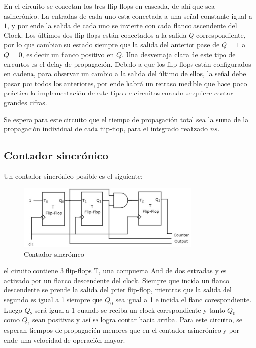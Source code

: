 En el circuito se conectan los tres flip-flops en cascada, de ahí que sea asincrónico. La entradas de cada uno esta conectada a una señal constante igual a $1$, y por ende la salida de cada uno se invierte con cada flanco ascendente del Clock. Los últimos dos flip-flops están conectados a la salida $\bar{Q}$ correspondiente, por lo que cambian su estado siempre que la salida del anterior pase de $Q = 1$ a $Q = 0$, es decir un flanco positivo en $\bar{Q}$. Una desventaja clara de este tipo de circuitos es el delay de propagación. Debido a que los flip-flops están configurados en cadena, para observar un cambio a la salida del último de ellos, la señal debe pasar por todos los anteriores, por ende habrá un retraso medible que hace poco práctica la implementación de este tipo de circuitos cuando se quiere contar grandes cifras. 


Se espera para este circuito que el tiempo de propagaci\'on total sea la suma de la propagaci\'on individual de cada flip-flop, para el integrado realizado $ns$.


\subsection{Contador sincrónico}

Un contador sincr\'onico posible es el siguiente:


\begin{figure}[H]
	\centering
	\includegraphics[width=0.8\textwidth]{Ejercicio7/Recursos/sincronico}
	\caption{Contador sincr\'onico}
\end{figure}

el ciruito contiene 3 flip-flops T, una compuerta And de dos entradas y es activado por un flanco descendente del clock. Siempre que incida un  flanco descendente se prende la salida del prier flip-flop, mientras que la salida del segundo es igual a 1 siempre que $Q_0$ sea igual a 1 e incida el flanc corespondiente. Luego $Q_2$ ser\'a igual a 1 cuando se reciba un clock corrspondiente y tanto $Q_0$ como $Q_1$ sean positivas y as\'i se logra contar hacia arriba. Para este circuito, se esperan tiempos de propagaci\'on menores que en el contador asincr\'onico y por ende una velocidad de operaci\'on mayor. 


